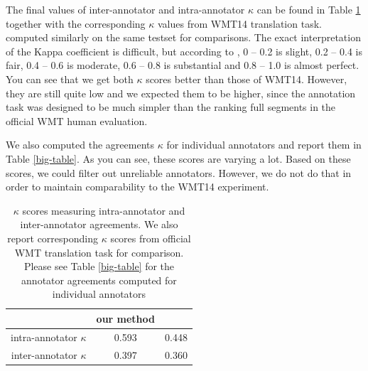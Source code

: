 The final values of inter-annotator and intra-annotator $\kappa$ can be found
in Table \ref{agreements} together with the corresponding $\kappa$ values
from WMT14 translation task.   computed similarly
on the same testset for comparisons.  The exact interpretation of the Kappa
coefficient is difficult, but according to \cite{landis77}, 0 -- 0.2 is slight,
0.2 -- 0.4 is fair, 0.4 -- 0.6 is moderate, 0.6 -- 0.8 is substantial and 0.8
-- 1.0 is almost perfect.  You can see that we get both $\kappa$ scores better
than those of WMT14. However, they are still quite low and we expected them
to be higher, since the annotation task was designed to be much simpler than
the ranking full segments in the official WMT human evaluation.

We also computed the agreements $\kappa$ for individual annotators and report
them in Table \ref{big-table}.  As you can see, these scores are varying a lot.
Based on these scores, we could filter out unreliable annotators. However, we
do not do that in order to maintain comparability to the WMT14 experiment.


\begin{table}
    \begin{center}
        \begin{tabular}{r|cc}
                                     & our method & \cite{wmt14-overview-paper} \\
            \hline
            intra-annotator $\kappa$ &  0.593     & 0.448    \\
            inter-annotator $\kappa$ &  0.397     & 0.360     \\
        \end{tabular}
    \end{center}

    \caption[Inter-annotator and intra-annotator $\kappa$ scores]{$\kappa$
        scores measuring intra-annotator and inter-annotator agreements. We
        also report corresponding $\kappa$ scores from official WMT translation
        task for comparison.  Please see Table \ref{big-table} for the
    annotator agreements computed for individual annotators}

    \label{agreements}
\end{table}


